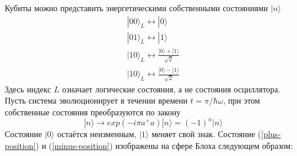 \documentclass[14pt,a4paper]{PhDthesis}
\begin{document}
Кубиты можно представить энергетическими собственными состояниями $|n\rangle$
\begin{eqnarray}
|00\rangle_{L} \longleftrightarrow |0\rangle   \\
|01\rangle_{L} \longleftrightarrow |1\rangle \\
|10\rangle_{L} \longleftrightarrow \frac{|0\rangle + |1\rangle}{\sqrt{2}} \label{plus-position} \\
|10\rangle_{L} \longleftrightarrow \frac{|0\rangle - |1\rangle}{\sqrt{2}} \label{minus-position}
\end{eqnarray}
Здесь индекс $L$ означает логические состояния, а не состояния осциллятора.
Пусть система эволюционирует в течении времени $t = \pi / \hbar\omega$, при этом собственные состояния преобразуются по закону
\begin{equation}
|n\rangle \rightarrow exp(-i\pi a^{+} a)|n\rangle = (-1)^{n}|n\rangle
\end{equation}
Состояние $|0\rangle$ остаётся неизменным, $|1\rangle$ меняет свой знак.
Состояние (\ref{plus-position}) и (\ref{minus-position}) изображены на сфере Блоха следующем образом:
\end{document}
